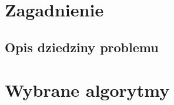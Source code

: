 \chapter{Zagadnienie }\label{Chapter_Domain}
\section{Opis dziedziny problemu}\label{Section_Problematyka}





\chapter{Wybrane algorytmy }\label{Chapter_Algorytmy}

